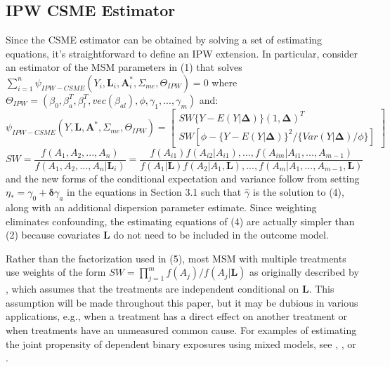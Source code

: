 \documentclass[useAMS,usenatbib,referee]{biom}
\begin{document}
\subsection{IPW CSME Estimator}

Since the CSME estimator can be obtained by solving a set of estimating equations, it's straightforward to define an IPW extension. In particular, consider an estimator of the MSM parameters in (1) that solves $\sum_{i=1}^{n} \psi_{IPW-CSME}(Y_{i}, \bm{L}_{i}, \bm{A}^{*}_{i}, \Sigma_{me}, \Theta_{IPW}) = 0$ where $\Theta_{IPW} = (\beta_{0}, \beta^{T}_{a}, \beta^{T}_{l}, vec(\beta_{al}), \phi, \gamma_{1}, ..., \gamma_{m})$ and:
\begin{equation}
    \psi_{IPW-CSME}(Y, \bm{L}, \bm{A}^{*}, \Sigma_{me}, \Theta_{IPW}) =
    \begin{bmatrix}
       SW \{ Y - E(Y | \bm{\Delta}) \} (1, \bm{\Delta})^{T} \\
       SW \left [ \phi - \{ Y - E(Y | \bm{\Delta})\}^{2} / \{ Var(Y | \bm{\Delta}) / \phi \} \right ]
    \end{bmatrix}
\end{equation}
\begin{equation}
SW = \frac{f(A_{1}, A_{2}, ..., A_{n})}{f(A_{1}, A_{2}, ..., A_{n} | \bm{L}_{i})} = \frac{f(A_{i1})f(A_{i2} | A_{i1}), ..., f(A_{im} | A_{i1}, ..., A_{m-1})}{f(A_{1} | \bm{L})f(A_{2} | A_{1}, \bm{L}), ..., f(A_{m} | A_{1}, ..., A_{m-1}, \bm{L})}
\end{equation}
and the new forms of the conditional expectation and variance follow from setting $\eta_{*} = \gamma_{0} + \bm{\delta}\gamma_{a}$ in the equations in Section 3.1 such that $\hat{\gamma}$ is the solution to (4), along with an additional dispersion parameter estimate. Since weighting eliminates confounding, the estimating equations of (4) are actually simpler than (2) because covariates $\bm{L}$ do not need to be included in the outcome model.

Rather than the factorization used in (5), most MSM with multiple treatments use weights of the form $SW = \prod_{j=1}^{m} f(A_{j}) / f(A_{j} | \bm{L})$ as originally described by \citet{hernan2001}, which assumes that the treatments are independent conditional on $\bm{L}$. This assumption will be made throughout this paper, but it may be dubious in various applications, e.g., when a treatment has a direct effect on another treatment or when treatments have an unmeasured common cause. For examples of estimating the joint propensity of dependent binary exposures using mixed models, see \citet{tchetgen2012}, \citet{perez2014}, or \citet*{liu2016}.
\end{document}
